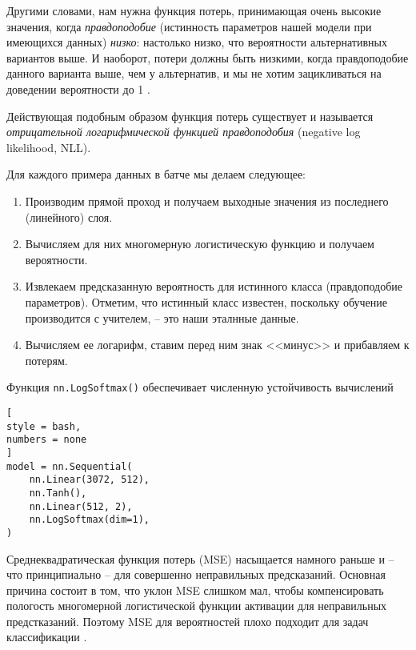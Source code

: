 \documentclass[%
	11pt,
	a4paper,
	utf8,
		]{article}
\begin{document}
{\color{blue}
Другими словами, нам нужна функция потерь, принимающая очень высокие значения, когда \emph{правдоподобие} (истинность параметров нашей модели при имеющихся данных) \emph{низко}: настолько низко, что вероятности альтернативных вариантов выше. И наоборот, потери должны быть низкими, когда правдоподобие данного варианта выше, чем у альтернатив, и мы не хотим зацикливаться на доведении вероятности до 1 \cite[]{pytorch-2022}.
}

Действующая подобным образом функция потерь существует и называется \emph{отрицательной логарифмической функцией правдоподобия} (negative log likelihood, NLL). 

Для каждого примера данных в батче мы делаем следующее:
\begin{enumerate}
	\item Производим прямой проход и получаем выходные значения из последнего (линейного) слоя.
	
	\item Вычисляем для них многомерную логистическую функцию и получаем вероятности.
	
	\item Извлекаем предсказанную вероятность для истинного класса (правдоподобие параметров). Отметим, что истинный класс известен, поскольку обучение производится с учителем, -- это наши эталнные данные.
	
	\item Вычисляем ее логарифм, ставим перед ним знак <<минус>> и прибавляем к потерям.
\end{enumerate}

Функция \verb|nn.LogSoftmax()| обеспечивает численную устойчивость вычислений
\begin{lstlisting}[
style = bash,
numbers = none
]
model = nn.Sequential(
    nn.Linear(3072, 512),
    nn.Tanh(),
    nn.Linear(512, 2),
    nn.LogSoftmax(dim=1),
)
\end{lstlisting}

Среднеквадратическая функция потерь (MSE) насыщается намного раньше и -- что принципиально -- для совершенно неправильных предсказаний. Основная причина состоит в том, что уклон MSE слишком мал, чтобы компенсировать пологость многомерной логистической функции активации для неправильных предстказаний. {\color{red}Поэтому MSE для вероятностей плохо подходит для задач классификации} \cite[]{pytorch-2022}.
\end{document}
